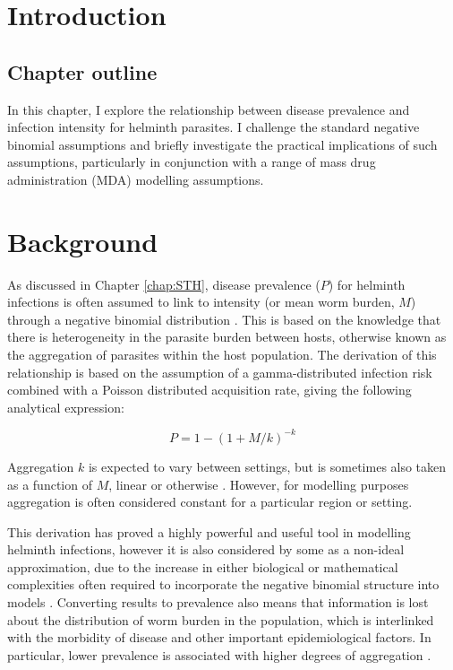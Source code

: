 \section{Introduction}

\subsection{Chapter outline}

In this chapter, I explore the relationship between disease prevalence and infection intensity for helminth parasites. I challenge the standard negative binomial assumptions and briefly investigate the practical implications of such assumptions, particularly in conjunction with a range of mass drug administration (MDA) modelling assumptions. 

\section{Background}

As discussed in Chapter \ref{chap:STH}, disease prevalence ($P$) for helminth infections is often assumed to link to intensity (or mean worm burden, $M$) through a negative binomial distribution \cite{Anderson1992}. This is based on the knowledge that there is heterogeneity in the parasite burden between hosts, otherwise known as the aggregation of parasites within the host population. The derivation of this relationship is based on the assumption of a gamma-distributed infection risk combined with a Poisson distributed acquisition rate, giving the following analytical expression:

\begin{equation}
P = 1 - (1+M/k)^{-k}
\label{eqn:negbin1}
\end{equation}

Aggregation $k$ is expected to vary between settings, but is sometimes also taken as a function of $M$, linear or otherwise \cite{Norman2000_epifil, Anderson1992}. However, for modelling purposes aggregation is often considered constant for a particular region or setting.

This derivation has proved a highly powerful and useful tool in modelling helminth infections, however it is also considered by some as a non-ideal approximation, due to the increase in either biological or mathematical complexities often required to incorporate the negative binomial structure into models \cite{Yakob2014}. Converting results to prevalence also means that information is lost about the distribution of worm burden in the population, which is interlinked with the morbidity of disease and other important epidemiological factors. In particular, lower prevalence is associated with higher degrees of aggregation \cite{Truscott2019}.


